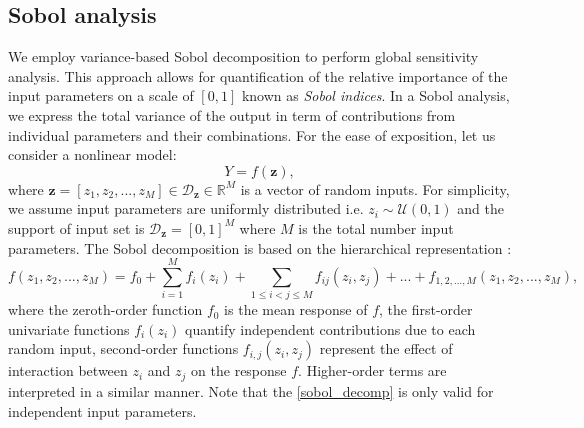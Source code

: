 \documentclass[review]{elsarticle}
\numberwithin{equation}{section}
\numberwithin{equation}{section}
\begin{document}
\subsection{Sobol analysis}
We employ variance-based Sobol decomposition to perform global sensitivity analysis. This approach allows for quantification of the relative importance of the input parameters on a scale of $[0,1]$ known as \emph{Sobol indices}. In a Sobol analysis, we express the total variance of the output in term of contributions from individual parameters and their combinations. For the ease of exposition, let us consider a nonlinear model:
\begin{equation}\label{nonlinear_model}
Y = f({\mathbf{z}}),
\end{equation}
where ${\mathbf{z}} = [z_1, z_2, ..., z_M]\in \mathcal{D}_{\mathbf{z}}\in \mathbb{R}^M$ is a vector of random inputs. For simplicity, we assume input parameters are uniformly distributed i.e. $z_i \sim \mathcal{U}(0,1)$ and the support of input set is $\mathcal{D}_{\mathbf{z}} = [0,1]^M$ where $M$ is the total number input parameters. The Sobol decomposition is based on the hierarchical representation \cite{RSmith}:
\begin{equation}\label{sobol_decomp}
f(z_1, z_2, ..., z_M) = f_0+\sum_{i=1}^M f_i(z_i) + \sum_{1\leq i<j\leq M} f_{ij}(z_i,z_j) + ... + f_{1, 2, ..., M}(z_1, z_2, ..., z_M),
\end{equation}
where the zeroth-order function $f_0$ is the mean response of $f$, the first-order univariate functions $f_i(z_i)$ quantify independent contributions due to each random input, second-order functions $f_{i,j}(z_i,z_j)$ represent the effect of interaction between $z_i$ and $z_j$ on the response $f$.  Higher-order terms are interpreted in a similar manner. Note that the \eqref{sobol_decomp} is only valid for independent input parameters.
\end{document}
